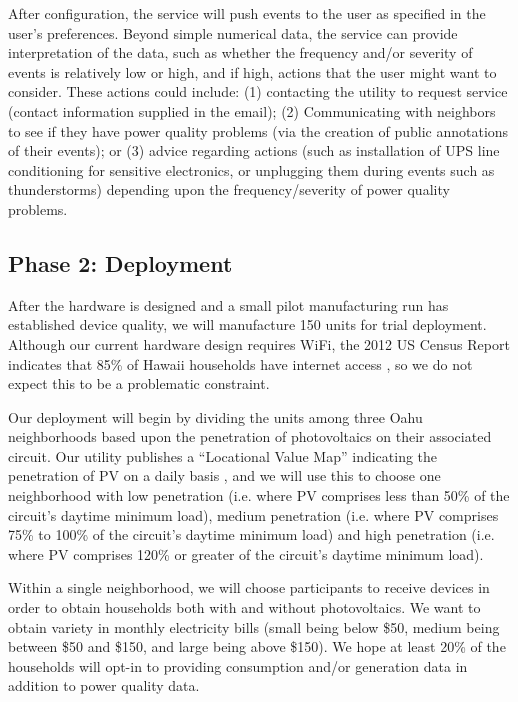 \documentclass[11pt]{article}
\begin{document}
After configuration, the service will push events to the user as specified in the user's preferences.  Beyond simple numerical data, the service can provide interpretation of the data, such as whether the frequency and/or severity of events is relatively low or high, and if high, actions that the user might want to consider.  These actions could include: (1) contacting the utility to request service (contact information supplied in the email); (2) Communicating with neighbors to see if they have power quality problems (via the creation of public annotations of their events); or (3) advice regarding actions (such as installation of UPS line conditioning for sensitive electronics, or unplugging them during events such as thunderstorms) depending upon the frequency/severity of power quality problems.

\subsection{Phase 2: Deployment}

After the hardware is designed and a small pilot manufacturing run has established device quality, we will manufacture 150 units for trial deployment.  Although our current hardware design requires WiFi, the 2012 US Census Report indicates that 85\% of Hawaii households have internet access \cite{home-internet-access}, so we do not expect this to be a problematic constraint. 

Our deployment will begin by dividing the units among three Oahu neighborhoods based upon the penetration of photovoltaics on their associated circuit.  Our utility publishes a ``Locational Value Map'' indicating the penetration of PV on a daily basis \cite{lvm}, and we will use this to choose one neighborhood with low penetration (i.e. where PV comprises less than 50\% of the circuit's daytime minimum load), medium penetration (i.e. where PV comprises 75\% to 100\% of the circuit's daytime minimum load) and high penetration (i.e. where PV comprises 120\% or greater of the circuit's daytime minimum load). 

Within a single neighborhood, we will choose participants to receive devices in order to obtain households both with and without photovoltaics. We want to obtain variety in monthly electricity bills (small being below \$50, medium being between \$50 and \$150, and large being above \$150).  We hope at least 20\% of the households will opt-in to providing consumption and/or generation data in addition to power quality data. 
\end{document}
